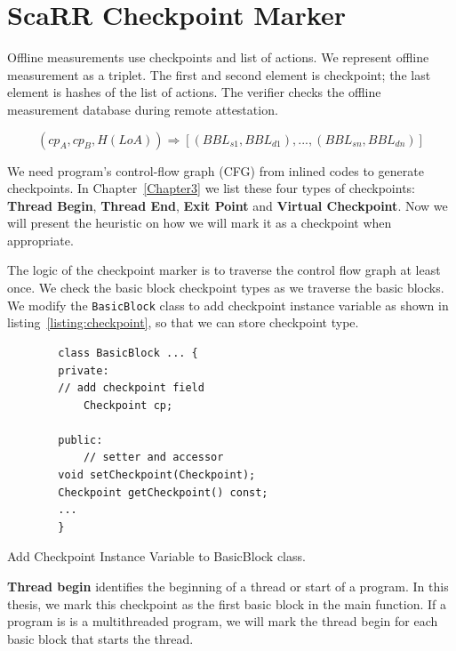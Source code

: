 \section{ScaRR Checkpoint Marker} 
\label{sec:scarr-checkpoint-marker}


Offline measurements use checkpoints and list of actions. We represent offline
measurement as a triplet. The first and second element is checkpoint; the last
element is hashes of the list of actions. The verifier checks the offline
measurement database during remote attestation.

$$(cp_A, cp_B, H(LoA)) \Rightarrow [(BBL_{s1}, BBL_{d1}), ..., (BBL_{sn},
BBL_{dn})]$$

We need program's control-flow graph (CFG) from inlined codes to generate
checkpoints. In Chapter~\ref{Chapter3} we list these four types of checkpoints:
\textbf{Thread Begin}, \textbf{Thread End}, \textbf{Exit Point} and
\textbf{Virtual Checkpoint}. Now we will present the heuristic on how we will
mark it as a checkpoint when appropriate.  

The logic of the checkpoint marker is to traverse the control flow graph at
least once. We check the basic block checkpoint types as we traverse the basic
blocks. We modify the \texttt{BasicBlock} class to add checkpoint instance variable as
shown in listing~\ref{listing:checkpoint}, so that we can store checkpoint type.

\begin{listing}[htbp]
    \begin{verbatim}
        class BasicBlock ... {
        private:
        // add checkpoint field
            Checkpoint cp;

        public:
            // setter and accessor
        void setCheckpoint(Checkpoint);
        Checkpoint getCheckpoint() const;
        ...
        }
    \end{verbatim}
    \caption{Add Checkpoint Instance Variable to BasicBlock class.}    
    \label{listing:checkpoint}
\end{listing}

\vspace{0.5cm}
\noindent \textbf{Thread begin} identifies the beginning of a thread or start of
a program. In this thesis, we mark this checkpoint as the first basic block in
the main function. If a program is is a multithreaded program, we will mark the
thread begin for each basic block that starts the thread.

